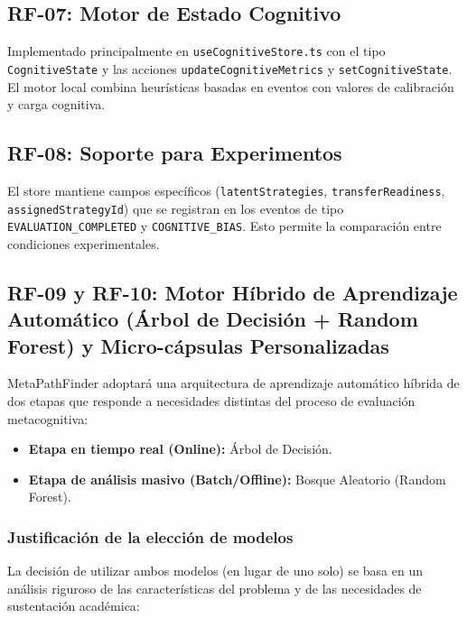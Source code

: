 \documentclass[11pt,a4paper]{article}
\begin{document}
\subsection{RF-07: Motor de Estado Cognitivo}

Implementado principalmente en \texttt{useCognitiveStore.ts} con el tipo \texttt{CognitiveState} y las acciones \texttt{updateCognitiveMetrics} y \texttt{setCognitiveState}. El motor local combina heurísticas basadas en eventos con valores de calibración y carga cognitiva.

\subsection{RF-08: Soporte para Experimentos}

El store mantiene campos específicos (\texttt{latentStrategies}, \texttt{transferReadiness}, \texttt{assignedStrategyId}) que se registran en los eventos de tipo \texttt{EVALUATION\_COMPLETED} y \texttt{COGNITIVE\_BIAS}. Esto permite la comparación entre condiciones experimentales.

\subsection{RF-09 y RF-10: Motor Híbrido de Aprendizaje Automático (Árbol de Decisión + Random Forest) y Micro-cápsulas Personalizadas}

MetaPathFinder adoptará una arquitectura de aprendizaje automático híbrida de dos etapas que responde a necesidades distintas del proceso de evaluación metacognitiva:

\begin{itemize}
    \item \textbf{Etapa en tiempo real (Online):} Árbol de Decisión.
    \item \textbf{Etapa de análisis masivo (Batch/Offline):} Bosque Aleatorio (Random Forest).
\end{itemize}

\subsubsection{Justificación de la elección de modelos}

La decisión de utilizar ambos modelos (en lugar de uno solo) se basa en un análisis riguroso de las características del problema y de las necesidades de sustentación académica:
\end{document}
